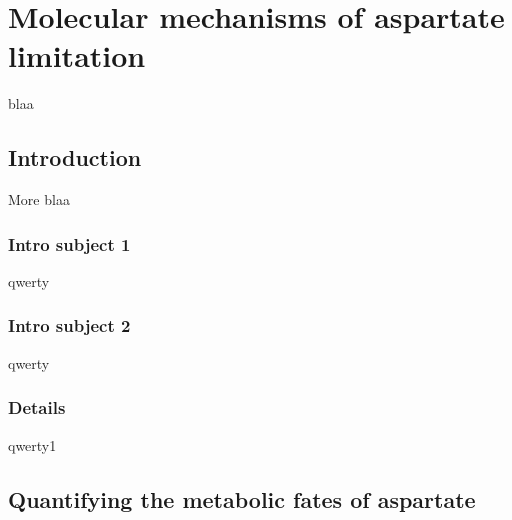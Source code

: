 \chapter{Molecular mechanisms of aspartate limitation}
blaa

\section{Introduction}
More blaa

\subsection{Intro subject 1}
qwerty

\subsection{Intro subject 2}
qwerty
\subsection{Details}
qwerty1




\section{Quantifying the metabolic fates of aspartate}



